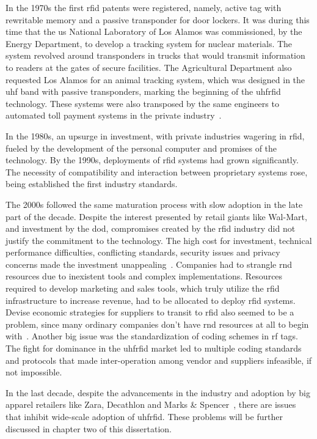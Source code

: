 In the 1970s the first \ac{rfid} patents were registered, namely, active tag with rewritable memory and a passive transponder for door lockers. It was during this time that the \ac{us} National Laboratory of Los Alamos was commissioned, by the Energy Department, to develop a tracking system for nuclear materials. The system revolved around transponders in trucks that would transmit information to readers at the gates of secure facilities. The Agricultural Department also requested Los Alamos for an animal tracking system, which was designed in the \ac{uhf} band with passive transponders, marking the beginning of the \ac{uhfrfid} technology. These systems were also transposed by the same engineers to automated toll payment systems in the private industry~\cite{landtHistoryRFID2005, HistoryRFIDTechnology,casierAnalogCircuitDesign2011}.

In the 1980s, an upsurge in investment, with private industries wagering in \ac{rfid}, fueled by the development of the personal computer and promises of the technology.
By the 1990s, deployments of \ac{rfid} systems had grown significantly. The necessity of compatibility and interaction between proprietary systems rose, being established the first industry standards. 

The 2000s followed the same maturation process with slow adoption in the late part of the decade. 
Despite the interest presented by retail giants like Wal-Mart, and investment by the \ac{dod}, compromises created by the \ac{rfid} industry did not justify the commitment to the technology. The high cost for investment, technical performance difficulties, conflicting standards, security issues and privacy concerns made the investment unappealing~\cite{RFIDAdoptionStalls}. 
Companies had to strangle \ac{rnd} resources due to inexistent tools and complex implementations. Resources required to develop marketing and sales tools, which truly utilize the \ac{rfid} infrastructure to increase revenue, had to be allocated to deploy \ac{rfid} systems.
Devise economic strategies for suppliers to transit to \ac{rfid} also seemed to be a problem, since many ordinary companies don't have \ac{rnd} resources at all to begin with~\cite{gaudinSuppliersGainFailed2008}.
Another big issue was the standardization of coding schemes in \ac{rf} tags. The fight for dominance in the \ac{uhfrfid} market led to multiple coding standards and protocols that made inter-operation among vendor and suppliers infeasible, if not impossible.

In the last decade, despite the advancements in the industry and adoption by big apparel retailers like Zara, Decathlon and Marks \& Spencer~\cite{RFIDRetailApparel}, there are issues that inhibit wide-scale adoption of \ac{uhfrfid}. These problems will be further discussed in chapter two of this dissertation.

